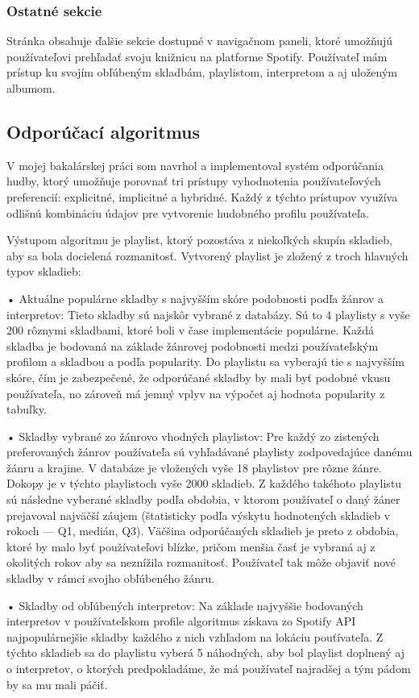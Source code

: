 \subsubsection{Ostatné sekcie}
Stránka obsahuje ďalšie sekcie dostupné v navigačnom paneli, ktoré umožňujú používateľovi prehľadať svoju knižnicu na platforme Spotify. Používateľ mám prístup ku svojím obľúbeným skladbám, playlistom, interpretom a aj uloženým albumom.


\subsection{Odporúčací algoritmus}
V mojej bakalárskej práci som navrhol a implementoval systém odporúčania hudby, ktorý umožňuje porovnať tri prístupy vyhodnotenia používateľových preferencií: explicitné, implicitné a hybridné. Každý z týchto prístupov využíva odlišnú kombináciu údajov pre vytvorenie hudobného profilu používateľa.

Výstupom algoritmu je playlist, ktorý pozostáva z niekoľkých skupín skladieb, aby sa bola docielená rozmanitosť. Vytvorený playlist je zložený z troch hlavných typov skladieb:

	•	Aktuálne populárne skladby s najvyšším skóre podobnosti podľa žánrov a interpretov:
Tieto skladby sú najskôr vybrané z databázy. Sú to 4 playlisty s vyše 200 rôznymi skladbami, ktoré boli v čase implementácie populárne. Každá skladba je bodovaná na základe žánrovej podobnosti medzi používateľským profilom a skladbou a podľa popularity. Do playlistu sa vyberajú tie s najvyšším skóre, čím je zabezpečené, že odporúčané skladby by mali byť podobné vkusu používateľa, no zároveň má jemný vplyv na výpočet aj hodnota popularity z tabuľky. 

	•	Skladby vybrané zo žánrovo vhodných playlistov:
Pre každý zo zistených preferovaných žánrov používateľa sú vyhľadávané playlisty zodpovedajúce danému žánru a krajine. V databáze je vložených vyše 18 playlistov pre rôzne žánre. Dokopy je v týchto playlistoch vyše 2000 skladieb. Z každého takéhoto playlistu sú následne vyberané skladby podľa obdobia, v ktorom používateľ o daný žáner prejavoval najväčší záujem (štatisticky podľa výskytu hodnotených skladieb v rokoch — Q1, medián, Q3). Väčšina odporúčaných skladieb je preto z obdobia, ktoré by malo byť používateľovi blízke, pričom menšia časť je vybraná aj z okolitých rokov aby sa neznížila rozmanitosť. Používateľ tak môže objaviť nové skladby v rámci svojho obľúbeného žánru.
	
    •	Skladby od obľúbených interpretov:
Na základe najvyššie bodovaných interpretov v používateľskom profile algoritmus získava zo Spotify API najpopulárnejšie skladby každého z nich vzhľadom na lokáciu pouťívateľa. Z týchto skladieb sa do playlistu vyberá 5 náhodných, aby bol playlist doplnený aj o interpretov, o ktorých predpokladáme, že má používateľ najradšej a tým pádom by sa mu mali páčiť.



